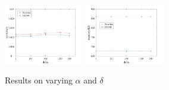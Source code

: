 \documentclass[color,twoside,amssymb,twocolumn]{article}
\begin{document}
\begin{figure}[htb]
{		\label{fig:subfig:a} %
		\includegraphics[height=0.18\textheight,width=0.31\textwidth]{f15.pdf}
		\label{fig:subfig:a} %
		\includegraphics[height=0.18\textheight,width=0.31\textwidth]{f16.pdf}}
	\hspace{1in} 
	~~	
	\caption{Results on varying $\alpha$ and $\delta$}
	\label{fig:subfig} %
\end{figure}
\end{document}
